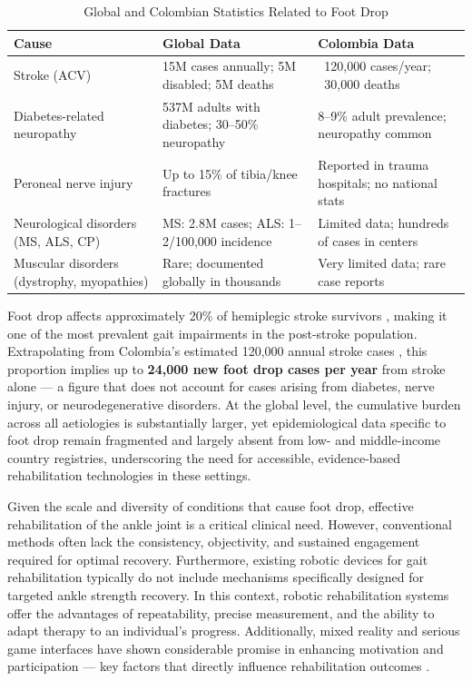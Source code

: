 \begin{table}[h]
\centering
\begin{tabular}{|p{}|p{}|p{}|}
\hline
\rowcolor{Gray}
\textbf{Cause} & \textbf{Global Data} & \textbf{Colombia Data} \\
\hline
Stroke (ACV) & 15M cases annually; 5M disabled; 5M deaths & ~120,000 cases/year; ~30,000 deaths \\
\hline
Diabetes-related neuropathy & 537M adults with diabetes; 30--50\% neuropathy & 8--9\% adult prevalence; neuropathy common \\
\hline
Peroneal nerve injury & Up to 15\% of tibia/knee fractures & Reported in trauma hospitals; no national stats \\
\hline
Neurological disorders (MS, ALS, CP) & MS: 2.8M cases; ALS: 1--2/100,000 incidence & Limited data; hundreds of cases in centers \\
\hline
Muscular disorders (dystrophy, myopathies) & Rare; documented globally in thousands & Very limited data; rare case reports \\
\hline
\end{tabular}
\caption{Global and Colombian Statistics Related to Foot Drop \cite{Recavar2026,WSO2025,ClevelandClinic2025,MayoClinic2025,IDF2025}}
\label{tab:footdrop_stats}
\end{table}

Foot drop affects approximately 20\% of hemiplegic stroke survivors \cite{Stewart2008, Kottink2004}, making it one of the most prevalent gait impairments in the post-stroke population.
Extrapolating from Colombia's estimated 120,000 annual stroke cases \cite{Recavar2026}, this proportion implies up to \textbf{24,000 new foot drop cases per year} from stroke alone — a figure that does not account for cases arising from diabetes, nerve injury, or neurodegenerative disorders.
At the global level, the cumulative burden across all aetiologies is substantially larger, yet epidemiological data specific to foot drop remain fragmented and largely absent from low- and middle-income country registries, underscoring the need for accessible, evidence-based rehabilitation technologies in these settings.

Given the scale and diversity of conditions that cause foot drop, effective rehabilitation of the ankle joint is a critical clinical need. However, 
conventional methods often lack the consistency, objectivity, and sustained engagement required for optimal recovery. Furthermore, existing robotic 
devices for gait rehabilitation typically do not include mechanisms specifically designed for targeted ankle strength recovery. In this context, 
robotic rehabilitation systems offer the advantages of repeatability, precise measurement, and the ability to adapt therapy to an individual’s 
progress. Additionally, mixed reality and serious game interfaces have shown considerable promise in enhancing motivation
and participation — key factors that directly influence rehabilitation outcomes \cite{Truijen2022}.

